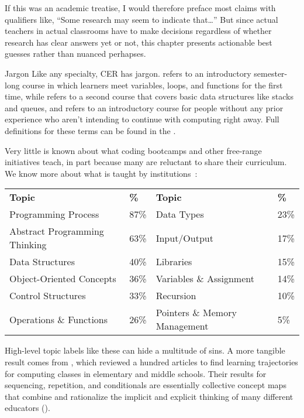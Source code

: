 If this was an academic treatise,
I would therefore preface most claims with qualifiers like,
``Some research may seem to indicate that{\ldots}''
But since actual teachers in actual classrooms have to make decisions
regardless of whether research has clear answers yet or not,
this chapter presents actionable best guesses rather than nuanced perhapses.

\begin{aside}{Jargon}
  Like any specialty,
  CER has jargon.
   refers to an introductory semester-long course
  in which learners meet variables, loops, and functions for the first time,
  while  refers to a second course
  that covers basic data structures like stacks and queues,
  and  refers to an introductory course
  for people without any prior experience
  who aren't intending to continue with computing right away.
  Full definitions for these terms can be found in
  the .
\end{aside}


Very little is known about what coding bootcamps and other free-range initiatives teach,
in part because many are reluctant to share their curriculum.
We know more about what is taught by institutions~\cite{Luxt2017}:

\begin{longtable}{llll}
\textbf{Topic}			& \textbf{\%}	& \textbf{Topic}		& \textbf{\%} \\
Programming Process     	& 87\%		& Data Types                    & 23\% \\
Abstract Programming Thinking	& 63\%		& Input/Output                  & 17\% \\
Data Structures      		& 40\%		& Libraries                     & 15\% \\
Object-Oriented Concepts        & 36\%		& Variables \& Assignment       & 14\% \\
Control Structures              & 33\%		& Recursion 			& 10\% \\
Operations \& Functions         & 26\%		& Pointers \& Memory Management	&  5\%
\end{longtable}

High-level topic labels like these can hide a multitude of sins.
A more tangible result comes from \cite{Rich2017},
which reviewed a hundred articles
to find learning trajectories for computing classes in elementary and middle schools.
Their results for sequencing, repetition, and conditionals are essentially collective concept maps
that combine and rationalize the implicit and explicit thinking of many different educators
().

